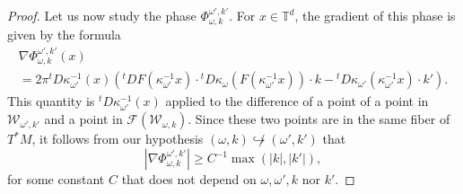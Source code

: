 \documentclass[10pt]{amsart}
\theoremstyle{definition}\newtheorem{defi}[theo]{Definition}\newtheorem{rema}[theo]{Remark}\newtheorem{exam}[theo]{Example}\newtheorem{exem}[theo]{Example}\newtheorem{nota}[theo]{Notation}
\newcommand{\p}[1]{\left(#1\right)}
\newcommand{\va}[1]{\left|#1\right|}
\newcommand{\clF}{\mathcal{F}}
\newcommand{\clW}{\mathcal{W}}
\newcommand{\bbT}{\mathbb{T}}
\begin{document}
\begin{proof}
Let us now study the phase $\Phi_{\omega,k}^{\omega',k'}$. For $x \in \bbT^d$, the gradient of this phase is given by the formula
\begin{multline*}
\nabla \Phi_{\omega,k}^{\omega',k'}(x) \\ = 2 \pi {}^t D \kappa_{\omega'}^{-1} (x)\p{{}^t D F \left(\kappa_{\omega'}^{-1} x\right) \cdot {}^t D \kappa_{\omega} \left(F\left(\kappa_{\omega'}^{-1} x\right)\right)\cdot k - {}^t D \kappa_{\omega'}\left(\kappa_{\omega'}^{-1}x\right) \cdot k'}.
\end{multline*}
This quantity is ${}^t D \kappa_{\omega'}^{-1} (x)$ applied to the difference of a point of a point in $\clW_{\omega',k'}$ and a point in $\clF(\clW_{\omega,k})$. Since these two points are in the same fiber of $T^* M$, it follows from our hypothesis $(\omega,k) \not\hookrightarrow (\omega',k')$ that
\begin{equation}\label{eq:lower_bound_phase}
\va{\nabla \Phi_{\omega,k}^{\omega',k'}} \geq C^{-1} \max(\va{k},\va{k'}),
\end{equation}
for some constant $C$ that does not depend on $\omega,\omega',k$ nor $k'$.


\end{proof}
\end{document}
